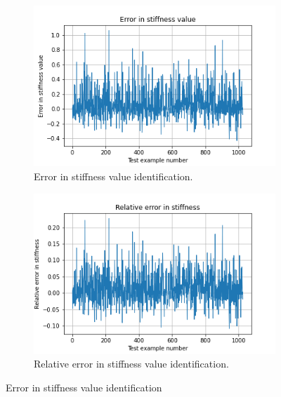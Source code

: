 \documentclass{article}
\begin{document}
\begin{figure}
  \centering
\begin{subfigure}[b]{0.95\textwidth}
    \centering  
    \includegraphics{circle_id/stiffval/plotabserror.png}
    \caption{\label{fig:stiffvalabserror} Error in stiffness value identification.}
\end{subfigure}
\begin{subfigure}[b]{0.95\textwidth}
    \centering  
    \includegraphics{circle_id/stiffval/plotrelcomparison.png}
    \caption{\label{fig:stiffvalrelerror} Relative error in stiffness value identification.}
\end{subfigure}
\caption{\label{fig:stiffvalerror} Error in stiffness value identification}
\end{figure}
\end{document}
